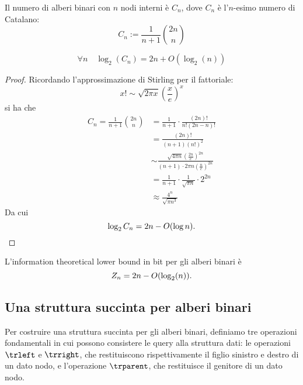 \begin{theorem}\label{thm:catalano}
	Il numero di alberi binari con $n$ nodi interni è $C_n$, dove $C_n$ è l'$n$-esimo numero di Catalano:
	\begin{equation*}
		C_n := \frac{1}{n+1}\binom{2n}{n}
	\end{equation*}
\end{theorem}
\begin{corollario}
	\begin{equation*}
		\forall n \quad\log_2(C_n)=2n+O(\log_2(n))
	\end{equation*}
\end{corollario}
\begin{proof}
	Ricordando l'approssimazione di Stirling per il fattoriale:
	\begin{equation*}
		x! \sim \sqrt{2\pi x} \left(\frac{x}{e}\right)^x
	\end{equation*}
	si ha che
	\begin{align*}
		C_n = \frac{1}{n+1}\binom{2n}{n} & = \frac{1}{n+1}\cdot\frac{(2n)!}{n!(2n-n)!}                                                             \\
		                                 & = \frac{(2n)!}{(n+1)(n!)^2}                                                                             \\
		                                 & \sim \frac{\sqrt{4\pi n}\left(\frac{2n}{e}\right)^{2n}}{(n+1)\cdot 2\pi n\left(\frac{n}{e}\right)^{2n}} \\
		                                 & = \frac{1}{n+1}\cdot \frac{1}{\sqrt{\pi n}}\cdot 2^{2n}                                                 \\
		                                 & \approx \frac{4^n}{\sqrt{\pi n^3}}
	\end{align*}
	Da cui
	\begin{equation*}
		\log_2 C_n = 2n-O(\log n) \text.
	\end{equation*}
\end{proof}
\begin{corollario}\label{corol:bitree:itlb}
	L'information theoretical lower bound in bit per gli alberi binari è
	\begin{equation*}
		Z_n = 2n-O(\log_2(n)) \text.
	\end{equation*}
\end{corollario}


\subsection{Una struttura succinta per alberi binari}
Per costruire una struttura succinta per gli alberi binari, definiamo tre operazioni fondamentali in cui possono consistere le query alla struttura dati: le operazioni $\trleft$ e $\trright$, che restituiscono rispettivamente il figlio sinistro e destro di un dato nodo, e l'operazione $\trparent$, che restituisce il genitore di un dato nodo.

